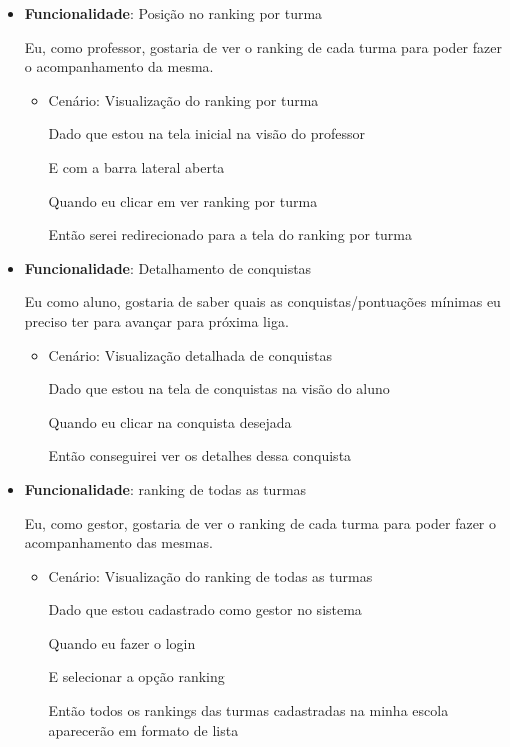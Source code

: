 \begin{itemize}
\item\textbf{Funcionalidade}: Posição no \gls{ranking} por turma
    
    Eu, como professor, gostaria de ver o \gls{ranking} de cada turma para poder fazer o acompanhamento da mesma.
    \begin{itemize}
        \item Cenário: Visualização do \gls{ranking} por turma
        \par Dado que estou na tela inicial na visão do professor
        \par E com a barra lateral aberta
        \par Quando eu clicar em ver \gls{ranking} por turma
        \par Então serei redirecionado para a tela do \gls{ranking} por turma
    \end{itemize}  

\item\textbf{Funcionalidade}: Detalhamento de conquistas
    
    Eu como aluno, gostaria de saber quais as conquistas/pontuações mínimas eu preciso ter para avançar para próxima liga.
    \begin{itemize}
        \item Cenário: Visualização detalhada de conquistas  
        \par Dado que estou na tela de conquistas na visão do aluno
        \par Quando eu clicar na conquista desejada
        \par Então conseguirei ver os detalhes dessa conquista
    \end{itemize}  

\item\textbf{Funcionalidade}: \gls{ranking} de todas as turmas
    
    Eu, como gestor, gostaria de ver o \gls{ranking} de cada turma para poder fazer o acompanhamento das mesmas.
    \begin{itemize}
        \item Cenário: Visualização do \gls{ranking} de todas as turmas
        \par Dado que estou cadastrado como gestor no sistema
        \par Quando eu fazer o login
        \par E selecionar a opção \gls{ranking}
        \par Então todos os \glspl{ranking} das turmas cadastradas na minha escola aparecerão em formato de lista
    \end{itemize}


\end{itemize}
